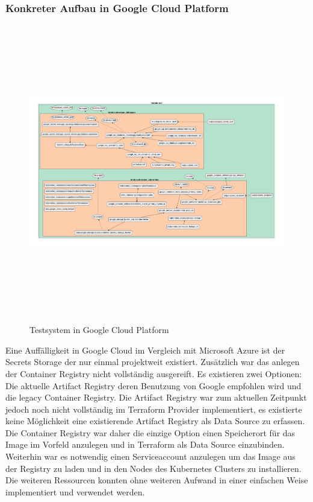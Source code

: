 \newpage
\begin{landscape}
\subsubsection{Konkreter Aufbau in Google Cloud Platform}
\begin{figure}[H]
  \includegraphics[keepaspectratio, height=13cm]{fig/hauptteil/gcp-terraform-graph-beautifier.png}
  \caption{Testsystem in Google Cloud Platform}
  \centering
\end{figure}
\end{landscape}

Eine Auffälligkeit in Google Cloud im Vergleich mit Microsoft Azure
ist der Secrets Storage der nur einmal projektweit existiert.
Zusätzlich war das anlegen der Container Registry nicht vollständig
ausgereift. Es existieren zwei Optionen: Die aktuelle Artifact
Registry deren Benutzung von Google empfohlen wird und die legacy
Container Registry. Die Artifact Registry war zum aktuellen Zeitpunkt
jedoch noch nicht vollständig im Terraform Provider implementiert,
es existierte keine Möglichkeit eine existierende Artifact Registry
als Data Source zu erfassen. Die Container Registry war daher die
einzige Option einen Speicherort für das Image im Vorfeld anzulegen
und in Terraform als Data Source einzubinden.\\
Weiterhin war es notwendig einen Serviceaccount anzulegen um das
Image aus der Registry zu laden und in den Nodes des Kubernetes
Clusters zu installieren.\\
Die weiteren Ressourcen konnten ohne weiteren Aufwand in einer
einfachen Weise implementiert und verwendet werden.

